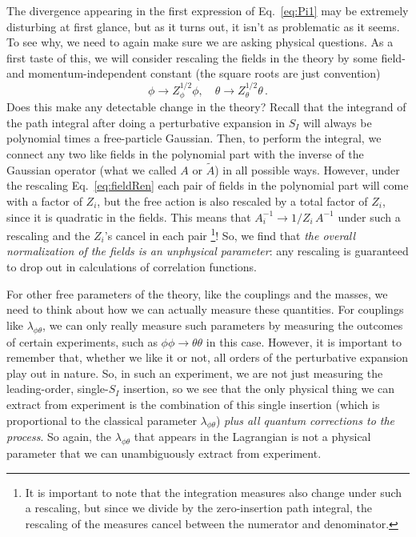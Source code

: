 \documentclass{article}
\newcommand{\td}[1]{\tilde{#1}}
\numberwithin{equation}{subsection}
\begin{document}
The divergence appearing in the first expression of Eq.~\eqref{eq:Pi1} may be extremely disturbing at first glance, but as it turns out, it isn't as problematic as it seems. To see why, 
we need to again make sure we are asking physical questions. As a first taste of this, we will consider rescaling the fields in the theory by some field- and momentum-independent constant 
(the square roots are just convention)
\begin{equation}\label{eq:fieldRen}
    \phi \to Z_\phi^{1/2}\phi, \quad \theta \to Z_\theta^{1/2}\theta\,.
\end{equation}
Does this make any detectable change in the theory? Recall that the integrand of the path integral after doing a perturbative expansion in $S_I$ will always be polynomial times a 
free-particle Gaussian. Then, to perform the integral, we connect any two like fields in the polynomial part with the inverse of the Gaussian operator (what we called $A$ or $\td A$) 
in all possible ways. However, under the rescaling Eq.~\eqref{eq:fieldRen} each pair of fields in the polynomial part will come with a factor of $Z_i$, but the free action is also 
rescaled by a total factor of $Z_i$, since it is quadratic in the fields. This means that $A_i^{-1}\to 1/Z_i\,A^{-1}$ under such a rescaling and the $Z_i$'s cancel in each pair
\footnote{It is important to note that the integration measures also change under such a rescaling, but since we divide by the zero-insertion path integral, the rescaling of the measures 
cancel between the numerator and denominator.}! So, we find that \textit{the overall normalization of the fields is an unphysical parameter}: any rescaling is guaranteed to drop out in 
calculations of correlation functions.

For other free parameters of the theory, like the couplings and the masses, we need to think about how we can actually measure these quantities. For couplings like $\lambda_{\phi\theta}$, 
we can only really measure such parameters by measuring the outcomes of certain experiments, such as $\phi\phi\to\theta\theta$ in this case. However, it is important to remember that, 
whether we like it or not, all orders of the perturbative expansion play out in nature. So, in such an experiment, we are not just measuring the leading-order, single-$S_I$ insertion, 
so we see that the only physical thing we can extract from experiment is the combination of this single insertion (which is proportional to the classical parameter $\lambda_{\phi\theta}$) 
\textit{plus all quantum corrections to the process}. So again, the $\lambda_{\phi\theta}$ that appears in the Lagrangian is not a physical parameter that we can unambiguously extract from experiment.
\end{document}
